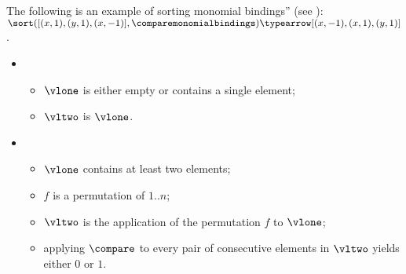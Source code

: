 The following is an example of sorting monomial bindings''
(see ):\\
$\sort([(x, 1), (y, 1), (x, -1)], \comparemonomialbindings) \typearrow [(x, -1), (x, 1), (y, 1)]$.

\ProseParagraph
\OneApplies
\begin{itemize}
  \item {}
  \begin{itemize}
    \item $\vlone$ is either empty or contains a single element;
    \item $\vltwo$ is $\vlone$.
  \end{itemize}

  \item {}
  \begin{itemize}
    \item $\vlone$ contains at least two elements;
    \item $f$ is a permutation of $1..n$;
    \item $\vltwo$ is the application of the permutation $f$ to $\vlone$;
    \item applying $\compare$ to every pair of consecutive elements in $\vltwo$ yields either $0$ or $1$.
  \end{itemize}
\end{itemize}

\FormallyParagraph
{}


